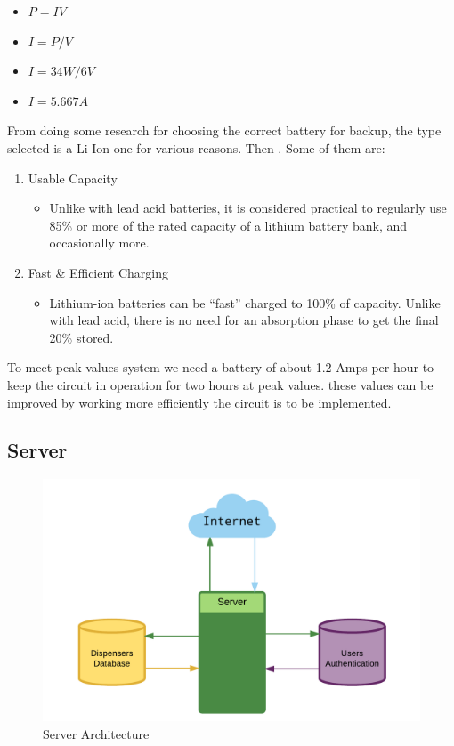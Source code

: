 \documentclass[12pt]{article}
\begin{document}
\begin{itemize}
  \item \(P = IV\)
  \item \(I = P/V\)
  \item \(I = 34W/6V\)
  \item \(I = 5.667A\)
\end{itemize}

From doing some research for choosing the correct battery for backup, the type selected is a Li-Ion one for various reasons. Then . Some of them are:

\begin{enumerate}
  \item Usable Capacity

  \begin{itemize}
    \item Unlike with lead acid batteries, it is considered practical to regularly use 85\% or more of the rated capacity of a lithium battery bank, and occasionally more.
  \end{itemize}

  \item Fast \& Efficient Charging
  \begin{itemize}
    \item Lithium-ion batteries can be “fast” charged to 100\% of capacity. Unlike with lead acid, there is no need for an absorption phase to get the final 20\% stored.
  \end{itemize}
\end{enumerate}

To meet peak values system we need a battery of about 1.2 Amps per hour to keep the circuit in operation for two hours at peak values. these values can be improved by working more efficiently the circuit is to be implemented.


\subsection{Server}

\begin{figure}[!htb]
  \includegraphics[width=\textwidth]{Figures/ArchitectureServer}
  \caption{Server Architecture}
  \label{fig:ServArchitecture}
\end{figure}
\end{document}
